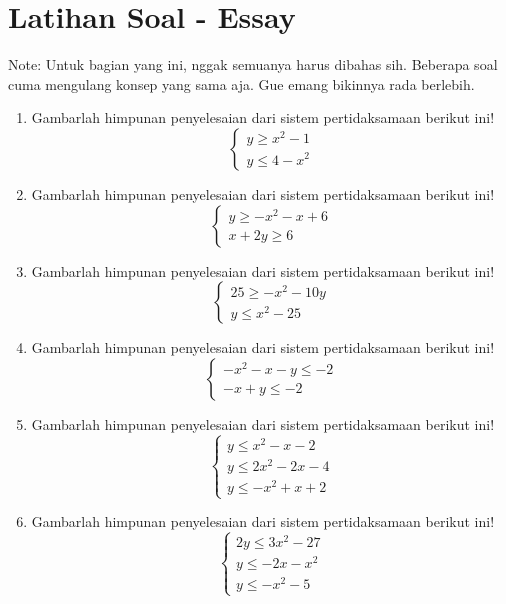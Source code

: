 \documentclass[fleqn, a4paper, 12pt]{article} %
\begin{document}
\section{Latihan Soal - Essay}

	Note: Untuk bagian yang ini, nggak semuanya harus dibahas sih. Beberapa soal cuma mengulang konsep yang sama aja. Gue emang bikinnya rada berlebih.

	\begin{enumerate}
		\item Gambarlah himpunan penyelesaian dari sistem pertidaksamaan berikut ini!
			\[\left\{\begin{array}{l}
				y \geq x^2 - 1 \\
				y \leq 4 - x^2
			\end{array}\right.\]
		\item Gambarlah himpunan penyelesaian dari sistem pertidaksamaan berikut ini!
			\[\left\{\begin{array}{l}
				y \geq -x^2 - x + 6	\\
				x + 2y \geq 6	
			\end{array}\right.\]
		\item Gambarlah himpunan penyelesaian dari sistem pertidaksamaan berikut ini!
			\[\left\{\begin{array}{l}
				25 \geq -x^2 - 10y \\
				y \leq x^2 - 25
			\end{array}\right.\]
		\item Gambarlah himpunan penyelesaian dari sistem pertidaksamaan berikut ini!
			\[\left\{\begin{array}{l}
				-x^2 - x - y \leq -2 \\
				-x + y \leq -2
			\end{array}\right.\]	
		\item Gambarlah himpunan penyelesaian dari sistem pertidaksamaan berikut ini!
			\[\left\{\begin{array}{l}
				y \leq x^2 - x - 2 \\
				y \leq 2x^2 - 2x - 4	\\
				y \leq -x^2 + x +2
			\end{array}\right.\]
		\item Gambarlah himpunan penyelesaian dari sistem pertidaksamaan berikut ini!
			\[\left\{\begin{array}{l}
				2y \leq 3x^2 - 27 \\
				y \leq -2x - x^2 \\
				y \leq -x^2 - 5
			\end{array}\right.\]

\end{enumerate}
\end{document}
